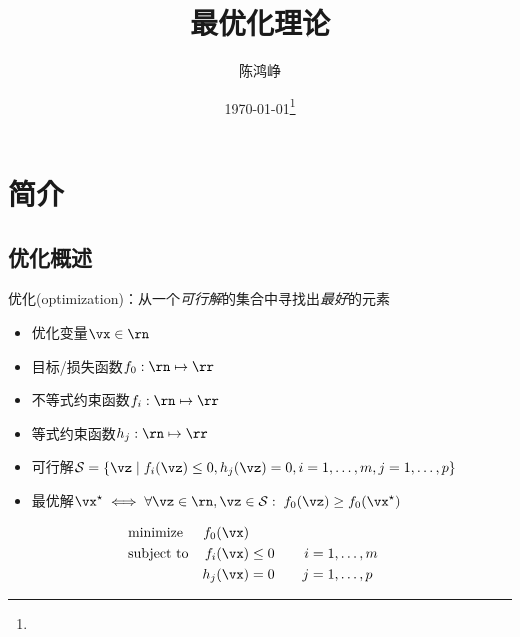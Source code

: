 \documentclass{note}
\title{最优化理论}
\author{陈鸿峥}
\date{{\builddatemonth\today}\protect\footnote{\text{Build \builddate\today}}}%
\renewcommand{\thefootnote}{\fnsymbol{footnote}}
\begin{document}
\maketitle
\renewcommand{\thefootnote}{\arabic{footnote}}
\setcounter{footnote}{0}

\setcounter{tocdepth}{2}%
\tableofcontents
\bigskip\bigskip\bigskip

\section{简介} %
\subsection{优化概述}
优化(optimization)：从一个\emph{可行解}的集合中寻找出\emph{最好}的元素
\begin{itemize}
	\item 优化变量$\vx\in\rn$
	\item 目标/损失函数$f_0:\rn\mapsto \rr$
	\item 不等式约束函数$f_i:\rn\mapsto \rr$
	\item 等式约束函数$h_j:\rn\mapsto\rr$
	\item 可行解$\mathcal{S}=\{\vz\mid f_i(\vz)\leq 0,h_j(\vz)=0,i=1,\ldots,m,j=1,\ldots,p\}$
	\item 最优解$\vx^\star\iff\forall \vz\in\rn,\vz\in\mathcal{S}:\;f_0(\vz)\geq f_0(\vx^\star)$
\end{itemize}
\[\begin{aligned}
& \text{minimize}& f_0(\vx)& &\\
& \text{subject to}& f_i(\vx)&\leq 0 &\quad i&=1,\ldots,m\\
&  & h_j(\vx)&=0 &\quad j&=1,\ldots,p
\end{aligned}\]
\end{document}
